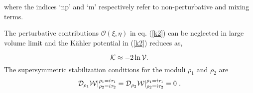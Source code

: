 \documentclass[doublecol]{epl2}
\begin{document}
where the indices `np' and `m' respectively refer to non-perturbative and mixing terms.\par
 The perturbative contributions  $\mathcal{O}(\xi,\eta)$ in eq. (\ref{k2}) can be neglected 
 in large volume limit and the K\"ahler potential in (\ref{k2}) reduces as\cite{Basiouris:2021sdf}, 

\begin{equation}\small
    \mathcal{K}\approx -2\ln\mathcal{V}.
    \label{ka}
\end{equation} The supersymmetric stabilization conditions for the moduli $\rho_1$ and $\rho_2$ are \cite{Basiouris:2021sdf}
\begin{equation}\small
\mathcal{D}_{\rho_1}\mathcal{W}|^{\rho_1 =i\tau_1}_{\rho_2 =i\tau_2}= \mathcal{D}_{\rho_2}\mathcal{W}|^{\rho_1 =i\tau_1}_{\rho_2 =i\tau_2}=0 \ .
\label{eq:super}
\end{equation}
 
\end{document}
